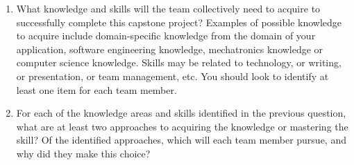 \documentclass[12pt]{article}
\begin{document}
\begin{enumerate}
  \item What knowledge and skills will the team collectively need to acquire to
  successfully complete this capstone project?  Examples of possible knowledge
  to acquire include domain-specific knowledge from the domain of your
  application, software engineering knowledge, mechatronics knowledge or
  computer science knowledge.  Skills may be related to technology, or writing,
  or presentation, or team management, etc.  You should look to identify at
  least one item for each team member.
  \item For each of the knowledge areas and skills identified in the previous
  question, what are at least two approaches to acquiring the knowledge or
  mastering the skill?  Of the identified approaches, which will each team
  member pursue, and why did they make this choice?
\end{enumerate}
\end{document}
